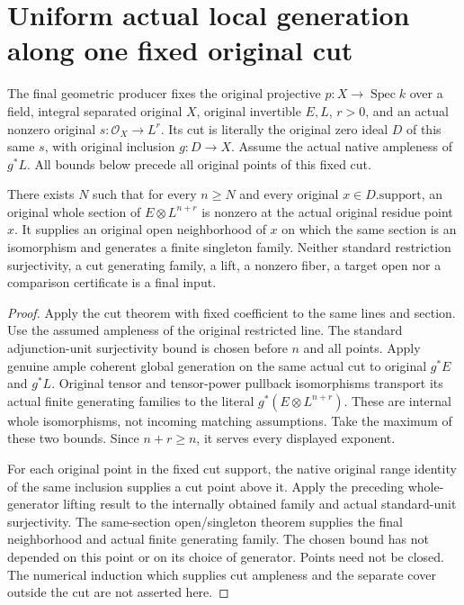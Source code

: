 \section{Uniform actual local generation along one fixed original cut}
The final geometric producer fixes the original projective $p:X\to\operatorname{Spec}k$
over a field, integral separated original $X$, original invertible $E,L$,
$r>0$, and an actual nonzero original $s:\mathcal O_X\to L^r$.
Its cut is literally the original zero ideal $D$ of this same $s$, with
original inclusion $g:D\to X$. Assume the actual native ampleness of
$g^*L$. All bounds below precede all original points of this fixed cut.

\begin{theorem}
\label{thm:original-fixed-cut-uniform-local-generation}
\leanok
There exists $N$ such that for every $n\ge N$ and every original
$x\in D.\mathrm{support}$, an original whole section of
$E\otimes L^{n+r}$ is nonzero at the actual original residue point $x$.
It supplies an original open neighborhood of $x$ on which the same
section is an isomorphism and generates a finite singleton family.
Neither standard restriction surjectivity, a cut generating family,
a lift, a nonzero fiber, a target open nor a comparison certificate is
a final input.
\end{theorem}
\begin{proof}
Apply the cut theorem with fixed coefficient to the same lines and section.
Use the assumed ampleness of the original restricted line. The standard
adjunction-unit surjectivity bound is chosen before $n$ and all points.
Apply genuine ample coherent global generation on the same actual cut
to original $g^*E$ and $g^*L$. Original tensor and tensor-power pullback
isomorphisms transport its actual finite generating families to the
literal $g^*(E\otimes L^{n+r})$. These are internal whole isomorphisms,
not incoming matching assumptions. Take the maximum of these two
bounds. Since $n+r\ge n$, it serves every displayed exponent.

For each original point in the fixed cut support, the native original
range identity of the same inclusion supplies a cut point above it.
Apply the preceding whole-generator lifting result to the internally
obtained family and actual standard-unit surjectivity. The same-section
open/singleton theorem supplies the final neighborhood and actual
finite generating family. The chosen bound has not depended on this
point or on its choice of generator. Points need not be closed.
The numerical induction which supplies cut ampleness and the separate
cover outside the cut are not asserted here.
\end{proof}
